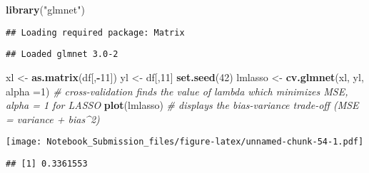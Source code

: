 \documentclass[
]{article}
\newenvironment{Shaded}{\begin{snugshade}}{\end{snugshade}}
\newcommand{\CommentTok}[1]{\textcolor[rgb]{0.56,0.35,0.01}{\textit{#1}}}
\newcommand{\DataTypeTok}[1]{\textcolor[rgb]{0.13,0.29,0.53}{#1}}
\newcommand{\DecValTok}[1]{\textcolor[rgb]{0.00,0.00,0.81}{#1}}
\newcommand{\FloatTok}[1]{\textcolor[rgb]{0.00,0.00,0.81}{#1}}
\newcommand{\KeywordTok}[1]{\textcolor[rgb]{0.13,0.29,0.53}{\textbf{#1}}}
\newcommand{\NormalTok}[1]{#1}
\newcommand{\OperatorTok}[1]{\textcolor[rgb]{0.81,0.36,0.00}{\textbf{#1}}}
\newcommand{\StringTok}[1]{\textcolor[rgb]{0.31,0.60,0.02}{#1}}
\begin{document}
\begin{Shaded}
\begin{Highlighting}[]
\KeywordTok{library}\NormalTok{(}\StringTok{"glmnet"}\NormalTok{)}
\end{Highlighting}
\end{Shaded}

\begin{verbatim}
## Loading required package: Matrix
\end{verbatim}

\begin{verbatim}
## Loaded glmnet 3.0-2
\end{verbatim}

\begin{Shaded}
\begin{Highlighting}[]
\NormalTok{xl <-}\StringTok{ }\KeywordTok{as.matrix}\NormalTok{(df[,}\OperatorTok{-}\DecValTok{11}\NormalTok{])}
\NormalTok{yl <-}\StringTok{ }\NormalTok{df[,}\DecValTok{11}\NormalTok{]}
\KeywordTok{set.seed}\NormalTok{(}\DecValTok{42}\NormalTok{)}
\NormalTok{lmlasso <-}\StringTok{ }\KeywordTok{cv.glmnet}\NormalTok{(xl, yl, }\DataTypeTok{alpha =}\DecValTok{1}\NormalTok{) }\CommentTok{# cross-validation finds the value of lambda which minimizes MSE, alpha = 1 for LASSO}
\KeywordTok{plot}\NormalTok{(lmlasso) }\CommentTok{# displays the bias-variance trade-off (MSE = variance + bias^2)}
\end{Highlighting}
\end{Shaded}

\texttt{[image: Notebook\_Submission\_files/figure-latex/unnamed-chunk-54-1.pdf]}

\begin{Shaded}
\end{Shaded}

\begin{verbatim}
## [1] 0.3361553
\end{verbatim}
\end{document}
